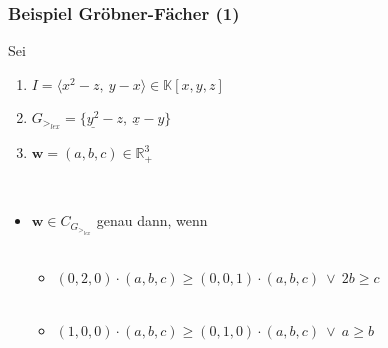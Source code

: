 \documentclass{beamer}
\begin{document}
\begin{frame}[<+->][fragile]
\frametitle{Beispiel Gröbner-Fächer (1)}
 Sei 
 \begin{enumerate}
 \item $I = \langle x^{2}-z,~y-x  \rangle \in \mathbb{K}\left[x,y,z\right]  $
 \item $G_{>_{lex}} = \{ \underline{y^{2}}-z,~\underline{x}-y  \} $ 
 \item $\textbf{w}= (a,b,c) \in \mathbb{R}^{3}_{+} $
\end{enumerate}
 
~\\
\begin{itemize}
\item $\textbf{w} \in C_{G_{>_{lex}}}$ genau dann, wenn 
~\\
~\\
\begin{itemize}
\item $ \left(0,2,0\right) \cdot \left(a,b,c\right) \geq \left(0,0,1\right) \cdot  \left(a,b,c\right) ~ \vee ~ 2b \geq c  $
~\\
~\\
\item
$ \left(1,0,0\right) \cdot \left(a,b,c\right) \geq \left(0,1,0\right) \cdot  \left(a,b,c\right) ~ \vee ~ a \geq b  $
\end{itemize}
\end{itemize}

\end{frame}
\end{document}
